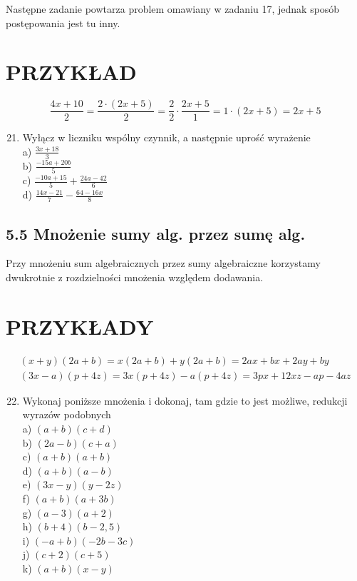 \documentclass[10pt]{article}
\begin{document}
Następne zadanie powtarza problem omawiany w zadaniu 17, jednak sposób postępowania jest tu inny.

\section*{PRZYKŁAD}
\[
\frac{4 x+10}{2}=\frac{2 \cdot(2 x+5)}{2}=\frac{2}{2} \cdot \frac{2 x+5}{1}=1 \cdot(2 x+5)=2 x+5
\]

\begin{enumerate}
  \setcounter{enumi}{20}
  \item Wyłącz w liczniku wspólny czynnik, a następnie uprość wyrażenie\\
a) \(\frac{3 x+18}{3}\)\\
b) \(\frac{-15 a+20 b}{5}\)\\
c) \(\frac{-10 a+15}{5}+\frac{24 a-42}{6}\)\\
d) \(\frac{14 x-21}{7}-\frac{64-16 x}{8}\)
\end{enumerate}

\subsection*{5.5 Mnożenie sumy alg. przez sumę alg.}
Przy mnożeniu sum algebraicznych przez sumy algebraiczne korzystamy dwukrotnie z rozdzielności mnożenia względem dodawania.

\section*{PRZYKŁADY}
\[
\begin{array}{r}
(x+y)(2 a+b)=x(2 a+b)+y(2 a+b)=2 a x+b x+2 a y+b y \\
(3 x-a)(p+4 z)=3 x(p+4 z)-a(p+4 z)=3 p x+12 x z-a p-4 a z
\end{array}
\]

\begin{enumerate}
  \setcounter{enumi}{21}
  \item Wykonaj poniższe mnożenia i dokonaj, tam gdzie to jest możliwe, redukcji wyrazów podobnych\\
a) \((a+b)(c+d)\)\\
b) \((2 a-b)(c+a)\)\\
c) \((a+b)(a+b)\)\\
d) \((a+b)(a-b)\)\\
e) \((3 x-y)(y-2 z)\)\\
f) \((a+b)(a+3 b)\)\\
g) \((a-3)(a+2)\)\\
h) \((b+4)(b-2,5)\)\\
i) \((-a+b)(-2 b-3 c)\)\\
j) \((c+2)(c+5)\)\\
k) \((a+b)(x-y)\)
\end{enumerate}
\end{document}
